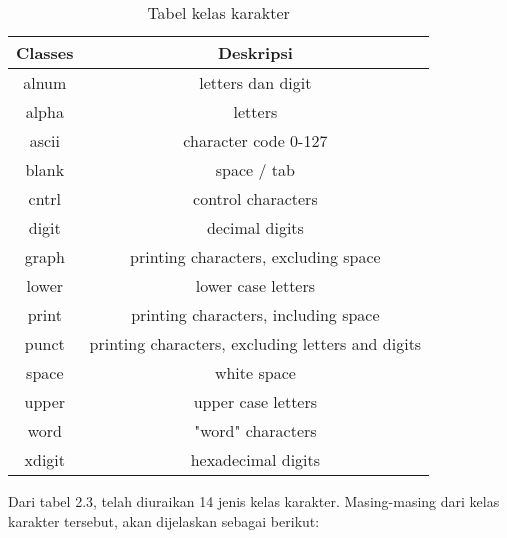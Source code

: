 \begin{table}[H]
	\caption {Tabel kelas karakter} \label{tab:character classes}
	\begin{center}
		\begin{tabular}{|c|c|}
		\hline 
		Classes & Deskripsi \\ 
		\hline 
		alnum & letters dan digit \\ 
		\hline 
		alpha & letters \\ 
		\hline 
		ascii & character code 0-127 \\ 
		\hline 
		blank & space / tab \\ 
		\hline 
		cntrl & control characters \\ 
		\hline 
		digit & decimal digits \\ 
		\hline 
		graph & printing characters, excluding space \\ 
		\hline 
		lower & lower case letters \\ 
		\hline 
		print & printing characters, including space \\ 
		\hline 
		punct & printing characters, excluding letters and digits \\ 
		\hline 
		space & white space \\ 
		\hline 
		upper & upper case letters \\ 
		\hline 
		word & "word" characters \\ 
		\hline 
		xdigit & hexadecimal digits \\ 
		\hline 
		\end{tabular} 
	\end{center}
\end{table}

Dari tabel 2.3, telah diuraikan 14 jenis kelas karakter. Masing-masing dari kelas karakter tersebut, akan dijelaskan sebagai berikut:

